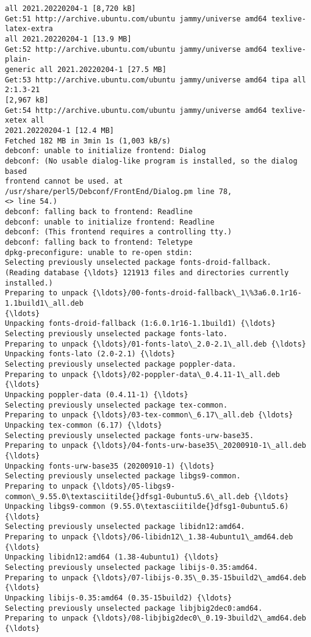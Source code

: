 \documentclass[11pt]{article}
\begin{document}
\begin{Verbatim}[commandchars=\\\{\}]
all 2021.20220204-1 [8,720 kB]
Get:51 http://archive.ubuntu.com/ubuntu jammy/universe amd64 texlive-latex-extra
all 2021.20220204-1 [13.9 MB]
Get:52 http://archive.ubuntu.com/ubuntu jammy/universe amd64 texlive-plain-
generic all 2021.20220204-1 [27.5 MB]
Get:53 http://archive.ubuntu.com/ubuntu jammy/universe amd64 tipa all 2:1.3-21
[2,967 kB]
Get:54 http://archive.ubuntu.com/ubuntu jammy/universe amd64 texlive-xetex all
2021.20220204-1 [12.4 MB]
Fetched 182 MB in 3min 1s (1,003 kB/s)
debconf: unable to initialize frontend: Dialog
debconf: (No usable dialog-like program is installed, so the dialog based
frontend cannot be used. at /usr/share/perl5/Debconf/FrontEnd/Dialog.pm line 78,
<> line 54.)
debconf: falling back to frontend: Readline
debconf: unable to initialize frontend: Readline
debconf: (This frontend requires a controlling tty.)
debconf: falling back to frontend: Teletype
dpkg-preconfigure: unable to re-open stdin:
Selecting previously unselected package fonts-droid-fallback.
(Reading database {\ldots} 121913 files and directories currently installed.)
Preparing to unpack {\ldots}/00-fonts-droid-fallback\_1\%3a6.0.1r16-1.1build1\_all.deb
{\ldots}
Unpacking fonts-droid-fallback (1:6.0.1r16-1.1build1) {\ldots}
Selecting previously unselected package fonts-lato.
Preparing to unpack {\ldots}/01-fonts-lato\_2.0-2.1\_all.deb {\ldots}
Unpacking fonts-lato (2.0-2.1) {\ldots}
Selecting previously unselected package poppler-data.
Preparing to unpack {\ldots}/02-poppler-data\_0.4.11-1\_all.deb {\ldots}
Unpacking poppler-data (0.4.11-1) {\ldots}
Selecting previously unselected package tex-common.
Preparing to unpack {\ldots}/03-tex-common\_6.17\_all.deb {\ldots}
Unpacking tex-common (6.17) {\ldots}
Selecting previously unselected package fonts-urw-base35.
Preparing to unpack {\ldots}/04-fonts-urw-base35\_20200910-1\_all.deb {\ldots}
Unpacking fonts-urw-base35 (20200910-1) {\ldots}
Selecting previously unselected package libgs9-common.
Preparing to unpack {\ldots}/05-libgs9-common\_9.55.0\textasciitilde{}dfsg1-0ubuntu5.6\_all.deb {\ldots}
Unpacking libgs9-common (9.55.0\textasciitilde{}dfsg1-0ubuntu5.6) {\ldots}
Selecting previously unselected package libidn12:amd64.
Preparing to unpack {\ldots}/06-libidn12\_1.38-4ubuntu1\_amd64.deb {\ldots}
Unpacking libidn12:amd64 (1.38-4ubuntu1) {\ldots}
Selecting previously unselected package libijs-0.35:amd64.
Preparing to unpack {\ldots}/07-libijs-0.35\_0.35-15build2\_amd64.deb {\ldots}
Unpacking libijs-0.35:amd64 (0.35-15build2) {\ldots}
Selecting previously unselected package libjbig2dec0:amd64.
Preparing to unpack {\ldots}/08-libjbig2dec0\_0.19-3build2\_amd64.deb {\ldots}

\end{Verbatim}
\end{document}
